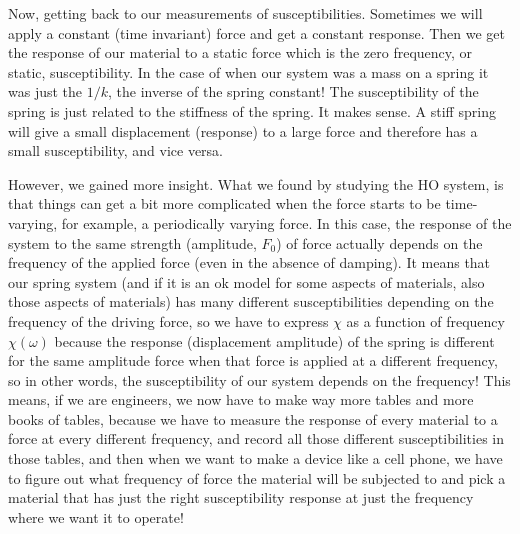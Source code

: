\documentclass[]{revtex4}
\begin{document}
Now, getting back to our measurements of susceptibilities.  Sometimes we will apply a
constant (time invariant) force and get a constant response. Then we get the response of our
material to a static force which is the zero frequency, or static, susceptibility.  In the
case of when our system was a mass on a spring it was just the $1/k$, the inverse of the
spring constant!  The susceptibility of the spring is just related to the stiffness of the
spring. It makes sense.  A stiff spring will give a small displacement (response) to a large
force and therefore has a small susceptibility, and vice versa.

However, we gained more insight.  What we found by studying the HO system, is that things
can get a bit more complicated when the force starts to be time-varying, for example, a
periodically varying force.  In this case, the response of the system to the same strength
(amplitude, $F_0$) of force actually depends on the frequency of the applied force (even in
the absence of damping).  It means that our spring system (and if it is an ok model for some
aspects of materials, also those aspects of materials) has many different susceptibilities
depending on the frequency of the driving force, so we have to express $\chi$ as a function
of frequency $\chi(\omega)$ because the response (displacement amplitude) of the spring is
different for the same amplitude force when that force is applied at a different frequency,
so in other words, the susceptibility of our system depends on the frequency!  This means,
if we are engineers, we now have to make way more tables and more books of tables, because
we have to measure the response of every material to a force at every different frequency,
and record all those different susceptibilities in those tables, and then when we want to
make a device like a cell phone, we have to figure out what frequency of force the material
will be subjected to and pick a material that has just the right susceptibility response at
just the frequency where we want it to operate!
\end{document}
